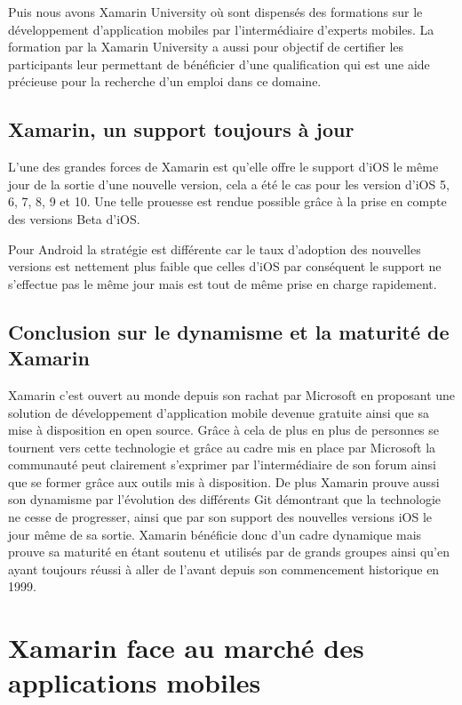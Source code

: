 \documentclass[11]{article}
\begin{document}
\vspace{0.5cm}
   
Puis nous avons Xamarin University où sont dispensés des formations sur le développement d’application mobiles par l’intermédiaire d’experts mobiles. La formation par la Xamarin University a aussi pour objectif de certifier les participants leur permettant de bénéficier d’une qualification qui est une aide précieuse pour la recherche d’un emploi dans ce domaine.



 \subsection{Xamarin, un support toujours à jour}
 L’une des grandes forces de Xamarin est qu’elle offre le support d’iOS le même jour de la sortie d’une nouvelle version, cela a été le cas pour les version d’iOS 5, 6, 7, 8, 9 et 10. Une telle prouesse est rendue possible grâce à la prise en compte des versions Beta d’iOS.
  
\vspace{0.5cm}
   
Pour Android la stratégie est différente car le taux d’adoption des nouvelles versions est nettement plus faible que celles d’iOS par conséquent le support ne s’effectue pas le même jour mais est tout de même prise en charge rapidement.

\subsection{Conclusion sur le dynamisme et la maturité de Xamarin}
Xamarin c’est ouvert au monde depuis son rachat par Microsoft en proposant une solution de développement d’application mobile devenue gratuite ainsi que sa mise à disposition en open source. Grâce à cela de plus en plus de personnes se tournent vers cette technologie et grâce au cadre mis en place par Microsoft la communauté peut clairement s’exprimer par l’intermédiaire de son forum ainsi que se former grâce aux outils mis à disposition. De plus Xamarin prouve aussi son dynamisme par l’évolution des différents Git démontrant que la technologie ne cesse de progresser, ainsi que par son support des nouvelles versions iOS le jour même de sa sortie. Xamarin bénéficie donc d’un cadre dynamique mais prouve sa maturité en étant soutenu et utilisés par de grands groupes ainsi qu’en ayant toujours réussi à aller de l’avant depuis son commencement historique en 1999.
 
 \section{Xamarin face au marché des applications mobiles}
 
\end{document}

